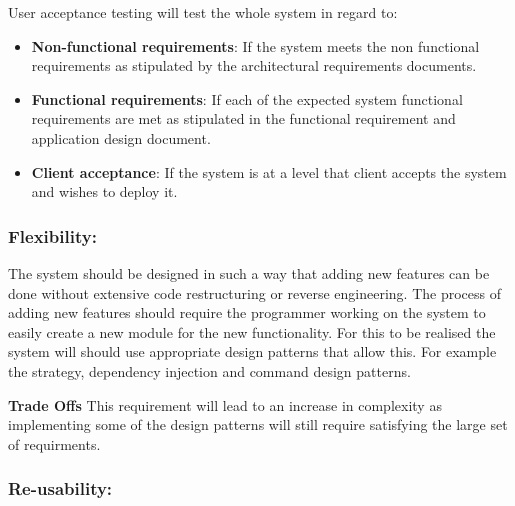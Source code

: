 \begin{flushleft}
\begin{flushleft}
\begin{itemize}
\end{itemize}

User acceptance testing will test the whole system in regard to:
\begin{itemize}

\item\textbf{Non-functional requirements}: If the system meets the non functional requirements as stipulated by the architectural requirements documents.
\item\textbf{Functional requirements}: If each of the expected system functional requirements are met as stipulated in the functional requirement and application design document.
\item\textbf{Client acceptance}: If the system is at a level that client accepts the system and wishes to deploy it.

\end{itemize}

\end{flushleft}



\end{flushleft}


\subsubsection{Flexibility:}

\begin{flushleft}

The system should be designed in such a way that adding new features can be done without extensive code restructuring or reverse engineering. The process of adding new features should require the programmer working on the system to easily create a new module for the new functionality. For this to be realised the system will should use appropriate design patterns that allow this. For example the strategy, dependency injection and command design patterns. 
\vspace{0.1in}

\textbf{Trade Offs}
This requirement will lead to an increase in complexity as implementing some of the design patterns will still require satisfying the large set of requirments.

\vspace{0.1in}

\end{flushleft}


\subsubsection{Re-usability:}

